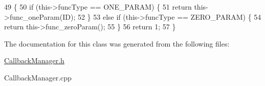 \begin{DoxyCode}
49                                                                \{
50     \textcolor{keywordflow}{if} (this->funcType == ONE\_PARAM) \{
51         \textcolor{keywordflow}{return} this->func\_oneParam(ID);
52     \}
53     \textcolor{keywordflow}{else} \textcolor{keywordflow}{if} (this->funcType == ZERO\_PARAM) \{
54         \textcolor{keywordflow}{return} this->func\_zeroParam();
55     \}
56     \textcolor{keywordflow}{return} 1;
57 \}\end{DoxyCode}


The documentation for this class was generated from the following files\-:\begin{DoxyCompactItemize}
\item 
\hyperlink{_callback_manager_8h}{Callback\-Manager.\-h}\item 
Callback\-Manager.\-cpp\end{DoxyCompactItemize}
